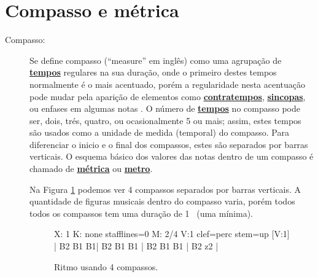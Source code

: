 \section{Compasso e métrica}
\label{sec:compaso}



\begin{description}
\item[Compasso:] \label{def:Compasso} Se define compasso (``measure'' em inglês)
como uma agrupação de \hyperref[sec:Tempo]{\textbf{tempos}} regulares na sua duração,
onde o primeiro destes tempos normalmente é o mais acentuado,
porém a regularidade nesta acentuação pode mudar pela aparição de elementos como \hyperref[sec:contratempo]{\textbf{contratempos}}, 
\hyperref[sec:sincope]{\textbf{sincopas}}, ou enfases em algumas notas  \cite[pp. 513]{apel1969harvard}. 
O número de \hyperref[sec:Tempo]{\textbf{tempos}} no compasso pode ser, dois, trés, quatro, ou ocasionalmente 5 ou mais;
assim, estes tempos são usados como a unidade de medida (temporal) do compasso.
Para diferenciar o inicio e o final dos compassos, 
estes são separados por barras verticais. 
O esquema básico dos valores das notas dentro de um compasso é chamado de \hyperref[def:Metrica]{\textbf{métrica}}  ou \hyperref[def:Metrica]{\textbf{metro}}.
\begin{example}
Na Figura \ref{fig:abc-exemplocompasso1} podemos ver 4 compassos separados por barras verticais.
A quantidade de figuras musicais dentro do compasso varia, 
porém todos todos os compassos tem uma duração de  1 \Halb~(uma mínima).
\end{example}
 
\begin{figure}[h]
\centering
\begin{abc}[name=abc-exemplocompasso1]
%
X: 1 %
K: none stafflines=0 %
M: 2/4
V:1 clef=perc stem=up %
%
[V:1] | B2 B1 B1| B2 B1 B1 | B2 B1 B1 | B2 z2  |
%       
\end{abc}
\caption{Ritmo usando 4 compassos.}
\label{fig:abc-exemplocompasso1}
\end{figure}


\end{description}
